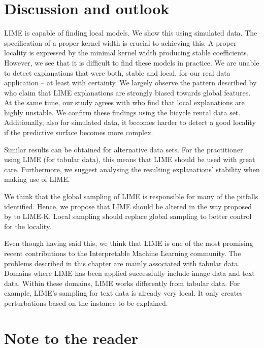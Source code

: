 \documentclass[]{krantz}
\begin{document}
\section{Discussion and outlook}\label{id5}

LIME is capable of finding local models. We show this using simulated
data. The specification of a proper kernel width is crucial to achieving
this. A proper locality is expressed by the minimal kernel width
producing stable coefficients. However, we see that it is difficult to
find these models in practice. We are unable to detect explanations that
were both, stable and local, for our real data application -- at least
with certainty. We largely observe the pattern described by
\citet{laugel2018defining} who claim that LIME explanations are strongly
biased towards global features. At the same time, our study agrees with
\citet{alvarez2018robustness} who find that local explanations are
highly unstable. We confirm these findings using the bicycle rental data
set. Additionally, also for simulated data, it becomes harder to detect
a good locality if the predictive surface becomes more complex.

Similar results can be obtained for alternative data sets. For the
practitioner using LIME (for tabular data), this means that LIME should
be used with great care. Furthermore, we suggest analysing the resulting
explanations' stability when making use of LIME.

We think that the global sampling of LIME is responsible for many of the
pitfalls identified. Hence, we propose that LIME should be altered in
the way proposed by \citet{laugel2018defining} to LIME-K. Local sampling
should replace global sampling to better control for the locality.

Even though having said this, we think that LIME is one of the most
promising recent contributions to the Interpretable Machine Learning
community. The problems described in this chapter are mainly associated
with tabular data. Domains where LIME has been applied successfully
include image data and text data. Within these domains, LIME works
differently from tabular data. For example, LIME's sampling for text
data is already very local. It only creates perturbations based on the
instance to be explained.

\section{Note to the reader}\label{id6}
\end{document}
